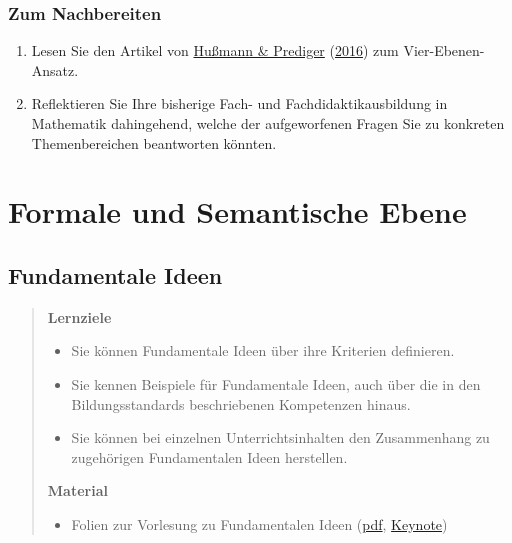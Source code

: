 \documentclass[
  ngerman,
]{scrbook}
\providecommand{\tightlist}{%
  \setlength{\itemsep}{0pt}\setlength{\parskip}{0pt}}
\theoremstyle{definition}
\theoremstyle{definition}
\theoremstyle{definition}
\theoremstyle{definition}
\theoremstyle{remark}
\begin{document}
\hypertarget{vier-ebenen-nachbereitung}{%
\section{Zum Nachbereiten}\label{vier-ebenen-nachbereitung}}

\begin{enumerate}
\def\labelenumi{\arabic{enumi}.}
\tightlist
\item
  Lesen Sie den Artikel von \protect\hyperlink{ref-Hussmann:2016}{Hußmann \& Prediger} (\protect\hyperlink{ref-Hussmann:2016}{2016}) zum Vier-Ebenen-Ansatz.
\item
  Reflektieren Sie Ihre bisherige Fach- und Fachdidaktikausbildung in Mathematik dahingehend, welche der aufgeworfenen Fragen Sie zu konkreten Themenbereichen beantworten könnten.
\end{enumerate}

\hypertarget{part-formale-und-semantische-ebene}{%
\part*{Formale und Semantische Ebene}\label{part-formale-und-semantische-ebene}}

\hypertarget{fundamentale-ideen}{%
\chapter{Fundamentale Ideen}\label{fundamentale-ideen}}

\begin{quote}
\textbf{Lernziele}

\begin{itemize}
\tightlist
\item
  Sie können Fundamentale Ideen über ihre Kriterien definieren.
\item
  Sie kennen Beispiele für Fundamentale Ideen, auch über die in den Bildungsstandards beschriebenen Kompetenzen hinaus.
\item
  Sie können bei einzelnen Unterrichtsinhalten den Zusammenhang zu zugehörigen Fundamentalen Ideen herstellen.
\end{itemize}

\textbf{Material}

\begin{itemize}
\tightlist
\item
  Folien zur Vorlesung zu Fundamentalen Ideen (\href{files/Stoffdidaktik-WiSe2122-Kap3.pdf}{pdf}, \href{files/Stoffdidaktik-WiSe2122-Kap3.key}{Keynote})
\end{itemize}
\end{quote}
\end{document}
